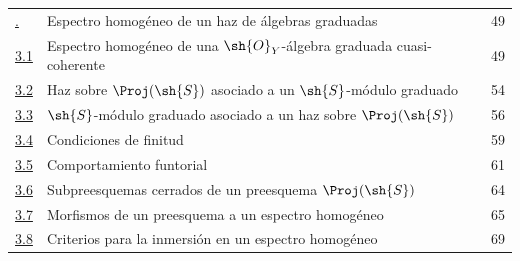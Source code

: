 \documentclass[oneside,10pt]{amsart}
\newcommand{\oldpage}[2][]{\marginnote{\normalfont\footnotesize\textbf{#1}~|~#2}\ignorespaces}
\begin{document}
\begin{longtable}{@{}p{}p{}r@{}}
\hyperref[section:II.3]{\textsection3.} & Espectro homogéneo de un haz de álgebras graduadas & 49\\
\hyperref[subsection:II.3.1]{3.1} & Espectro homogéneo de una $\sh{O}_Y$-álgebra graduada cuasi-coherente & 49\\
\hyperref[subsection:II.3.2]{3.2} & Haz sobre $\Proj(\sh{S})$ asociado a un $\sh{S}$-módulo graduado & 54\\
\hyperref[subsection:II.3.3]{3.3} & $\sh{S}$-módulo graduado asociado a un haz sobre $\Proj(\sh{S})$ & 56\\
\hyperref[subsection:II.3.4]{3.4} & Condiciones de finitud & 59\\
\hyperref[subsection:II.3.5]{3.5} & Comportamiento funtorial & 61\\
\hyperref[subsection:II.3.6]{3.6} & Subpreesquemas cerrados de un preesquema $\Proj(\sh{S})$ & 64\\
\hyperref[subsection:II.3.7]{3.7} & Morfismos de un preesquema a un espectro homogéneo & 65\\
\hyperref[subsection:II.3.8]{3.8} & Criterios para la inmersión en un espectro homogéneo & 69\\
\end{longtable}
\oldpage[II]{214}
\end{document}
